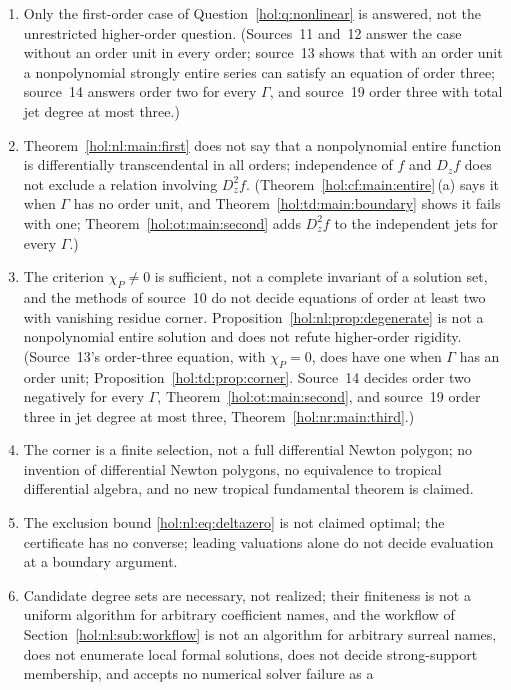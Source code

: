 \documentclass[11pt]{article}
\numberwithin{equation}{section}
\theoremstyle{definition}
\theoremstyle{remark}
\begin{document}
\begin{enumerate}[label=\textup{(N\arabic*)}]
\item Only the first-order case of Question~\ref{hol:q:nonlinear} is
answered, not the unrestricted higher-order question. (Sources~11 and~12
answer the case without an order unit in every order; source~13 shows that
with an order unit a nonpolynomial strongly entire series can satisfy an
equation of order three; source~14 answers order two for every $\Gamma$, and
source~19 order three with total jet degree at most three.)
\item Theorem~\ref{hol:nl:main:first} does not say that a nonpolynomial
entire function is differentially transcendental in all orders; independence
of $f$ and $D_zf$ does not exclude a relation involving $D_z^2f$.
(Theorem~\ref{hol:cf:main:entire}\,(a) says it when $\Gamma$ has no order
unit, and Theorem~\ref{hol:td:main:boundary} shows it fails with one;
Theorem~\ref{hol:ot:main:second} adds $D_z^2f$ to the independent jets for
every $\Gamma$.)
\item The criterion $\chi_P\ne0$ is sufficient, not a complete invariant of a
solution set, and the methods of source~10 do not decide equations of order
at least two with vanishing residue corner. Proposition~\ref{hol:nl:prop:degenerate} is not
a nonpolynomial entire solution and does not refute higher-order rigidity.
(Source~13's order-three equation, with $\chi_P=0$, does have one when
$\Gamma$ has an order unit; Proposition~\ref{hol:td:prop:corner}. Source~14
decides order two negatively for every $\Gamma$,
Theorem~\ref{hol:ot:main:second}, and source~19 order three in jet degree at
most three, Theorem~\ref{hol:nr:main:third}.)
\item The corner is a finite selection, not a full differential Newton
polygon; no invention of differential Newton polygons, no equivalence to
tropical differential algebra, and no new tropical fundamental theorem is
claimed.
\item The exclusion bound \eqref{hol:nl:eq:deltazero} is not claimed optimal;
the certificate has no converse; leading valuations alone do not decide
evaluation at a boundary argument.
\item Candidate degree sets are necessary, not realized; their finiteness is
not a uniform algorithm for arbitrary coefficient names, and the workflow of
Section~\ref{hol:nl:sub:workflow} is not an algorithm for arbitrary surreal
names, does not enumerate local formal solutions, does not decide
strong-support membership, and accepts no numerical solver failure as a

\end{enumerate}
\end{document}
